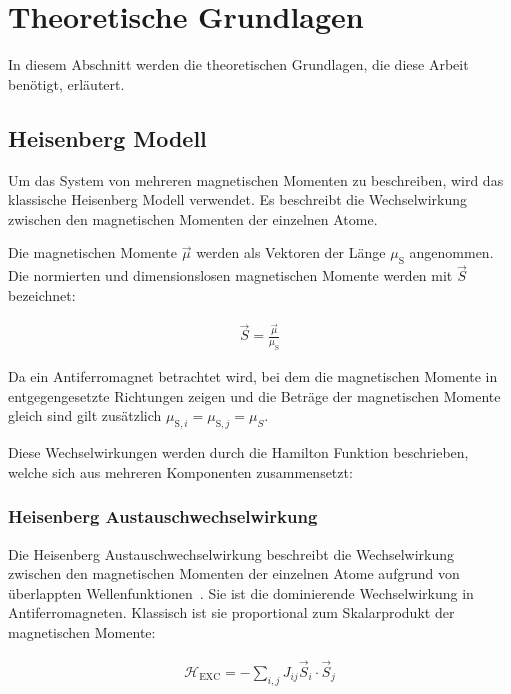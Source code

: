 \documentclass[main.tex]{subfiles}
\begin{document}
\section{Theoretische Grundlagen}

In diesem Abschnitt werden die theoretischen Grundlagen, die diese Arbeit
benötigt, erläutert.

\subsection{Heisenberg Modell}

Um das System von mehreren magnetischen Momenten zu beschreiben, wird das
klassische Heisenberg Modell verwendet. Es beschreibt die Wechselwirkung
zwischen den magnetischen Momenten der einzelnen Atome.

Die magnetischen Momente \(\vec{\mu}\) werden als Vektoren der Länge
\(\mu_{\text{S}}\) angenommen.
Die normierten und dimensionslosen magnetischen Momente werden mit \(\vec{S}\)
bezeichnet:

\begin{align}
	\vec{S} = \frac{\vec{\mu}}{\mu_{\text{S}}}
\end{align}

Da ein Antiferromagnet betrachtet wird, bei dem die magnetischen Momente in
entgegengesetzte Richtungen zeigen und die Beträge der magnetischen Momente
gleich sind gilt zusätzlich \(\mu_{\text{S},i} = \mu_{\text{S},j} = \mu_{S}\).

Diese Wechselwirkungen werden durch die Hamilton Funktion beschrieben, welche
sich aus mehreren Komponenten zusammensetzt:

\subsubsection*{Heisenberg Austauschwechselwirkung}

Die Heisenberg Austauschwechselwirkung beschreibt die Wechselwirkung zwischen
den magnetischen Momenten der einzelnen Atome aufgrund von überlappten
Wellenfunktionen~\cite{Heisenberg-Ferromagnetismus}. Sie ist die dominierende
Wechselwirkung in Antiferromagneten. Klassisch ist sie proportional zum
Skalarprodukt der magnetischen Momente:

\begin{align}
	\mathcal{H}_{\text{EXC}} = -\sum_{i,j} J_{ij} \vec{S}_i \cdot \vec{S}_j
\end{align}
\end{document}
